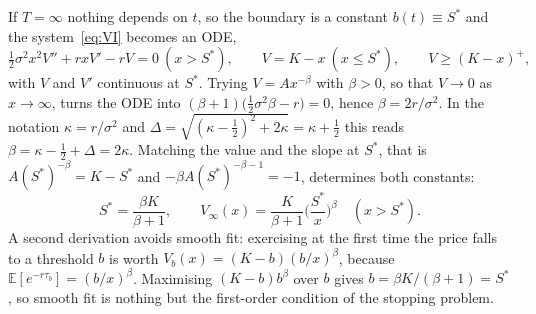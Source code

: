 If $T=\infty$ nothing depends on $t$, so the boundary is a constant $b(t)\equiv S^*$ and the system~\eqref{eq:VI} becomes an ODE,
\begin{equation}\label{eq:perp}
 \tfrac12\sigma^2x^2V''+rxV'-rV=0\ (x>S^*),\qquad V=K-x\ (x\le S^*),\qquad V\ge(K-x)^+,
\end{equation}
with $V$ and $V'$ continuous at $S^*$.
Trying $V=Ax^{-\beta}$ with $\beta>0$, so that $V\to0$ as $x\to\infty$, turns the ODE into $(\beta+1)\big(\tfrac12\sigma^2\beta-r\big)=0$, hence $\beta=2r/\sigma^2$.
In the notation $\kappa=r/\sigma^2$ and $\Delta=\sqrt{(\kappa-\frac12)^2+2\kappa}=\kappa+\frac12$ this reads $\beta=\kappa-\frac12+\Delta=2\kappa$.
Matching the value and the slope at $S^*$, that is $A(S^*)^{-\beta}=K-S^*$ and $-\beta A(S^*)^{-\beta-1}=-1$, determines both constants:
\begin{equation}\label{eq:Vinf}
 S^*=\frac{\beta K}{\beta+1},\qquad V_\infty(x)=\frac{K}{\beta+1}\Big(\frac{S^*}{x}\Big)^{\beta}\quad(x>S^*).
\end{equation}
A second derivation avoids smooth fit: exercising at the first time the price falls to a threshold $b$ is worth $V_b(x)=(K-b)(b/x)^\beta$, because $\mathbb E[e^{-r\tau_b}]=(b/x)^\beta$.
Maximising $(K-b)b^\beta$ over $b$ gives $b=\beta K/(\beta+1)=S^*$, so smooth fit is nothing but the first-order condition of the stopping problem.
